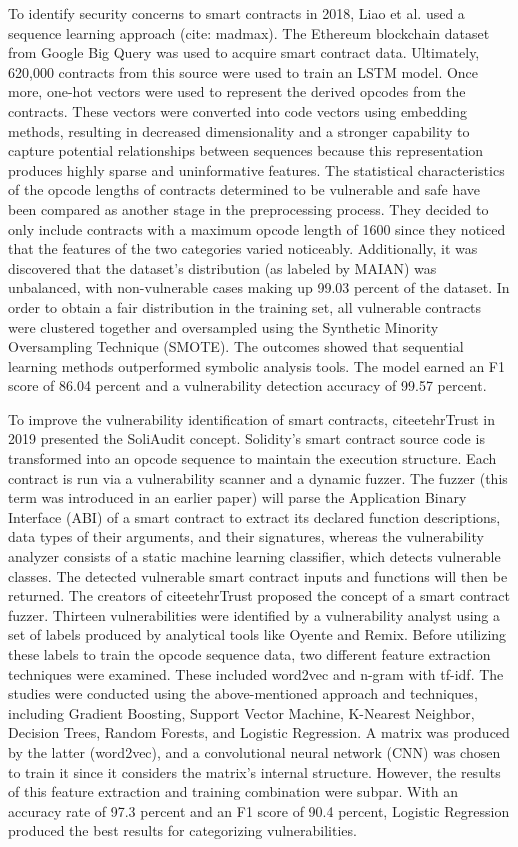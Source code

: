 To identify security concerns to smart contracts in 2018, Liao et al. used a sequence learning approach (cite: madmax).
The Ethereum blockchain dataset from Google Big Query was used to acquire smart contract data.
Ultimately, 620,000 contracts from this source were used to train an LSTM model. Once more, one-hot vectors were used to represent the derived opcodes from the contracts.
These vectors were converted into code vectors using embedding methods, resulting in decreased dimensionality and a stronger capability to capture potential relationships between sequences because this representation produces highly sparse and uninformative features.
The statistical characteristics of the opcode lengths of contracts determined to be vulnerable and safe have been compared as another stage in the preprocessing process.
They decided to only include contracts with a maximum opcode length of 1600 since they noticed that the features of the two categories varied noticeably.
Additionally, it was discovered that the dataset's distribution (as labeled by MAIAN) was unbalanced, with non-vulnerable cases making up 99.03 percent of the dataset.
In order to obtain a fair distribution in the training set, all vulnerable contracts were clustered together and oversampled using the Synthetic Minority Oversampling Technique (SMOTE).
The outcomes showed that sequential learning methods outperformed symbolic analysis tools.
The model earned an F1 score of 86.04 percent and a vulnerability detection accuracy of 99.57 percent.

To improve the vulnerability identification of smart contracts, citeetehrTrust in 2019 presented the SoliAudit concept.
Solidity's smart contract source code is transformed into an opcode sequence to maintain the execution structure.
Each contract is run via a vulnerability scanner and a dynamic fuzzer.
The fuzzer (this term was introduced in an earlier paper) will parse the Application Binary Interface (ABI) of a smart contract to extract its declared function descriptions, data types of their arguments, and their signatures, whereas the vulnerability analyzer consists of a static machine learning classifier, which detects vulnerable classes.
The detected vulnerable smart contract inputs and functions will then be returned.
The creators of citeetehrTrust proposed the concept of a smart contract fuzzer.
Thirteen vulnerabilities were identified by a vulnerability analyst using a set of labels produced by analytical tools like Oyente and Remix.
Before utilizing these labels to train the opcode sequence data, two different feature extraction techniques were examined. These included word2vec and n-gram with tf-idf.
The studies were conducted using the above-mentioned approach and techniques, including Gradient Boosting, Support Vector Machine, K-Nearest Neighbor, Decision Trees, Random Forests, and Logistic Regression.
A matrix was produced by the latter (word2vec), and a convolutional neural network (CNN) was chosen to train it since it considers the matrix's internal structure.
However, the results of this feature extraction and training combination were subpar.
With an accuracy rate of 97.3 percent and an F1 score of 90.4 percent, Logistic Regression produced the best results for categorizing vulnerabilities.


